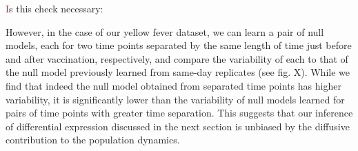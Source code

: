 \documentclass[letterpaper,english,prl,reprint,longbibliography]{revtex4-1} %
\newcommand{\re}[1]{\textcolor{red}{#1}}
\begin{document}
{\re Is this check necessary:}

However, in the case of our yellow fever dataset, we can learn a pair of null models, each for two time points separated by the same length of time just before and after vaccination, respectively, and compare the variability of each to that of the null model previously learned from same-day replicates (see fig. X). 
While we find that indeed the null model obtained from separated time points has higher variability, it is significantly lower than the variability of null models learned for pairs of time points with greater time separation. 
This suggests that our inference of differential expression discussed in the next section is unbiased by the diffusive contribution to the population dynamics. 

\end{document}

